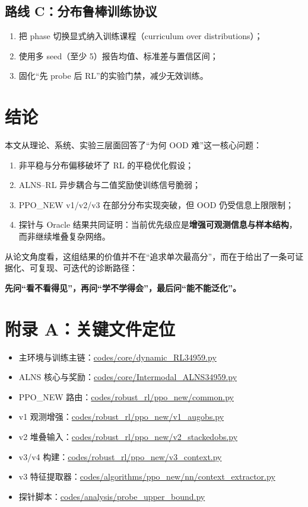 ﻿\documentclass[11pt,a4paper]{ctexart}
\begin{document}
\subsection{路线 C：分布鲁棒训练协议}
\begin{enumerate}[leftmargin=*]
  \item 把 phase 切换显式纳入训练课程（curriculum over distributions）；
  \item 使用多 seed（至少 5）报告均值、标准差与置信区间；
  \item 固化“先 probe 后 RL”的实验门禁，减少无效训练。
\end{enumerate}

\section{结论}
本文从理论、系统、实验三层面回答了“为何 OOD 难”这一核心问题：
\begin{enumerate}[leftmargin=*]
  \item 非平稳与分布偏移破坏了 RL 的平稳优化假设；
  \item ALNS--RL 异步耦合与二值奖励使训练信号脆弱；
  \item PPO\_NEW v1/v2/v3 在部分分布实现突破，但 OOD 仍受信息上限限制；
  \item 探针与 Oracle 结果共同证明：当前优先级应是\textbf{增强可观测信息与样本结构}，而非继续堆叠复杂网络。
\end{enumerate}

从论文角度看，这组结果的价值并不在“追求单次最高分”，而在于给出了一条可证据化、可复现、可迭代的诊断路径：
\begin{center}
\textbf{先问“看不看得见”，再问“学不学得会”，最后问“能不能泛化”。}
\end{center}

\section*{附录 A：关键文件定位}
\begin{itemize}
  \item 主环境与训练主链：\url{codes/core/dynamic_RL34959.py}
  \item ALNS 核心与奖励：\url{codes/core/Intermodal_ALNS34959.py}
  \item PPO\_NEW 路由：\url{codes/robust_rl/ppo_new/common.py}
  \item v1 观测增强：\url{codes/robust_rl/ppo_new/v1_augobs.py}
  \item v2 堆叠输入：\url{codes/robust_rl/ppo_new/v2_stackedobs.py}
  \item v3/v4 构建：\url{codes/robust_rl/ppo_new/v3_context.py}
  \item v3 特征提取器：\url{codes/algorithms/ppo_new/nn/context_extractor.py}
  \item 探针脚本：\url{codes/analysis/probe_upper_bound.py}
\end{itemize}
\end{document}
